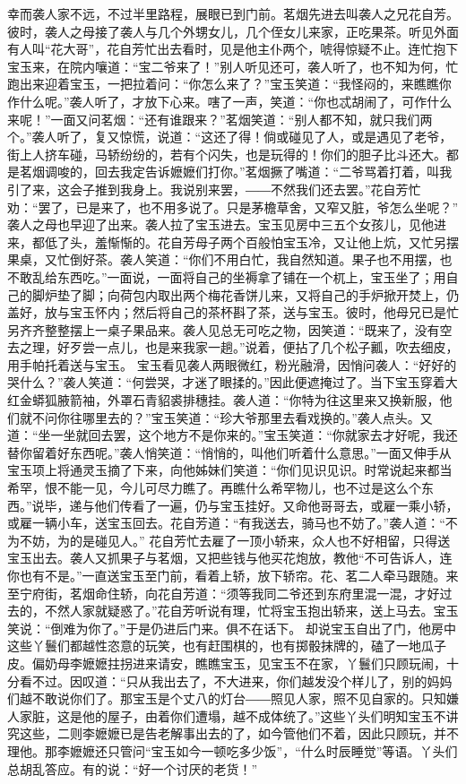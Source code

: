 \documentclass[12pt,oneside]{book}
\begin{document}
幸而袭人家不远，不过半里路程，展眼已到门前。茗烟先进去叫袭人之兄花自芳。彼时，袭人之母接了袭人与几个外甥女儿，几个侄女儿来家，正吃果茶。听见外面有人叫“花大哥”，花自芳忙出去看时，见是他主仆两个，唬得惊疑不止。连忙抱下宝玉来，在院内嚷道：“宝二爷来了！”别人听见还可，袭人听了，也不知为何，忙跑出来迎着宝玉，一把拉着问：“你怎么来了？”宝玉笑道：“我怪闷的，来瞧瞧你作什么呢。”袭人听了，才放下心来。嗐了一声，笑道：“你也忒胡闹了，可作什么来呢！”一面又问茗烟：“还有谁跟来？”茗烟笑道：“别人都不知，就只我们两个。”袭人听了，复又惊慌，说道：“这还了得！倘或碰见了人，或是遇见了老爷，街上人挤车碰，马轿纷纷的，若有个闪失，也是玩得的！你们的胆子比斗还大。都是茗烟调唆的，回去我定告诉嬷嬷们打你。”茗烟撅了嘴道：“二爷骂着打着，叫我引了来，这会子推到我身上。我说别来罢，――不然我们还去罢。”花自芳忙劝：“罢了，已是来了，也不用多说了。只是茅檐草舍，又窄又脏，爷怎么坐呢？”
袭人之母也早迎了出来。袭人拉了宝玉进去。宝玉见房中三五个女孩儿，见他进来，都低了头，羞惭惭的。花自芳母子两个百般怕宝玉冷，又让他上炕，又忙另摆果桌，又忙倒好茶。袭人笑道：“你们不用白忙，我自然知道。果子也不用摆，也不敢乱给东西吃。”一面说，一面将自己的坐褥拿了铺在一个杌上，宝玉坐了；用自己的脚炉垫了脚；向荷包内取出两个梅花香饼儿来，又将自己的手炉掀开焚上，仍盖好，放与宝玉怀内；然后将自己的茶杯斟了茶，送与宝玉。彼时，他母兄已是忙另齐齐整整摆上一桌子果品来。袭人见总无可吃之物，因笑道：“既来了，没有空去之理，好歹尝一点儿，也是来我家一趟。”说着，便拈了几个松子瓤，吹去细皮，用手帕托着送与宝玉。
宝玉看见袭人两眼微红，粉光融滑，因悄问袭人：“好好的哭什么？”袭人笑道：“何尝哭，才迷了眼揉的。”因此便遮掩过了。当下宝玉穿着大红金蟒狐腋箭袖，外罩石青貂裘排穗挂。袭人道：“你特为往这里来又换新服，他们就不问你往哪里去的？”宝玉笑道：“珍大爷那里去看戏换的。”袭人点头。又道：“坐一坐就回去罢，这个地方不是你来的。”宝玉笑道：“你就家去才好呢，我还替你留着好东西呢。”袭人悄笑道：“悄悄的，叫他们听着什么意思。”一面又伸手从宝玉项上将通灵玉摘了下来，向他姊妹们笑道：“你们见识见识。时常说起来都当希罕，恨不能一见，今儿可尽力瞧了。再瞧什么希罕物儿，也不过是这么个东西。”说毕，递与他们传看了一遍，仍与宝玉挂好。又命他哥哥去，或雇一乘小轿，或雇一辆小车，送宝玉回去。花自芳道：“有我送去，骑马也不妨了。”袭人道：“不为不妨，为的是碰见人。”
花自芳忙去雇了一顶小轿来，众人也不好相留，只得送宝玉出去。袭人又抓果子与茗烟，又把些钱与他买花炮放，教他“不可告诉人，连你也有不是。”一直送宝玉至门前，看着上轿，放下轿帘。花、茗二人牵马跟随。来至宁府街，茗烟命住轿，向花自芳道：“须等我同二爷还到东府里混一混，才好过去的，不然人家就疑惑了。”花自芳听说有理，忙将宝玉抱出轿来，送上马去。宝玉笑说：“倒难为你了。”于是仍进后门来。俱不在话下。
却说宝玉自出了门，他房中这些丫鬟们都越性恣意的玩笑，也有赶围棋的，也有掷骰抹牌的，磕了一地瓜子皮。偏奶母李嬷嬷拄拐进来请安，瞧瞧宝玉，见宝玉不在家，丫鬟们只顾玩闹，十分看不过。因叹道：“只从我出去了，不大进来，你们越发没个样儿了，别的妈妈们越不敢说你们了。那宝玉是个丈八的灯台――照见人家，照不见自家的。只知嫌人家脏，这是他的屋子，由着你们遭塌，越不成体统了。”这些丫头们明知宝玉不讲究这些，二则李嬷嬷已是告老解事出去的了，如今管他们不着，因此只顾玩，并不理他。那李嬷嬷还只管问“宝玉如今一顿吃多少饭”，“什么时辰睡觉”等语。丫头们总胡乱答应。有的说：“好一个讨厌的老货！”
\end{document}
